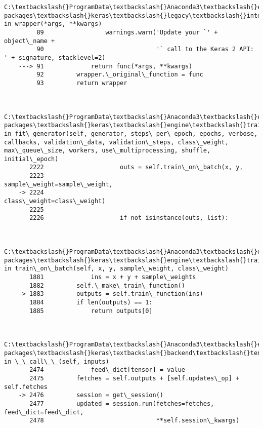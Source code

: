 \documentclass[11pt]{article}
\begin{document}
\begin{Verbatim}[commandchars=\\\{\}]
        C:\textbackslash{}ProgramData\textbackslash{}Anaconda3\textbackslash{}envs\textbackslash{}nbkeras\textbackslash{}lib\textbackslash{}site-packages\textbackslash{}keras\textbackslash{}legacy\textbackslash{}interfaces.py in wrapper(*args, **kwargs)
         89                 warnings.warn('Update your `' + object\_name +
         90                               '` call to the Keras 2 API: ' + signature, stacklevel=2)
    ---> 91             return func(*args, **kwargs)
         92         wrapper.\_original\_function = func
         93         return wrapper
    

        C:\textbackslash{}ProgramData\textbackslash{}Anaconda3\textbackslash{}envs\textbackslash{}nbkeras\textbackslash{}lib\textbackslash{}site-packages\textbackslash{}keras\textbackslash{}engine\textbackslash{}training.py in fit\_generator(self, generator, steps\_per\_epoch, epochs, verbose, callbacks, validation\_data, validation\_steps, class\_weight, max\_queue\_size, workers, use\_multiprocessing, shuffle, initial\_epoch)
       2222                     outs = self.train\_on\_batch(x, y,
       2223                                                sample\_weight=sample\_weight,
    -> 2224                                                class\_weight=class\_weight)
       2225 
       2226                     if not isinstance(outs, list):
    

        C:\textbackslash{}ProgramData\textbackslash{}Anaconda3\textbackslash{}envs\textbackslash{}nbkeras\textbackslash{}lib\textbackslash{}site-packages\textbackslash{}keras\textbackslash{}engine\textbackslash{}training.py in train\_on\_batch(self, x, y, sample\_weight, class\_weight)
       1881             ins = x + y + sample\_weights
       1882         self.\_make\_train\_function()
    -> 1883         outputs = self.train\_function(ins)
       1884         if len(outputs) == 1:
       1885             return outputs[0]
    

        C:\textbackslash{}ProgramData\textbackslash{}Anaconda3\textbackslash{}envs\textbackslash{}nbkeras\textbackslash{}lib\textbackslash{}site-packages\textbackslash{}keras\textbackslash{}backend\textbackslash{}tensorflow\_backend.py in \_\_call\_\_(self, inputs)
       2474             feed\_dict[tensor] = value
       2475         fetches = self.outputs + [self.updates\_op] + self.fetches
    -> 2476         session = get\_session()
       2477         updated = session.run(fetches=fetches, feed\_dict=feed\_dict,
       2478                               **self.session\_kwargs)
    


\end{Verbatim}
\end{document}
